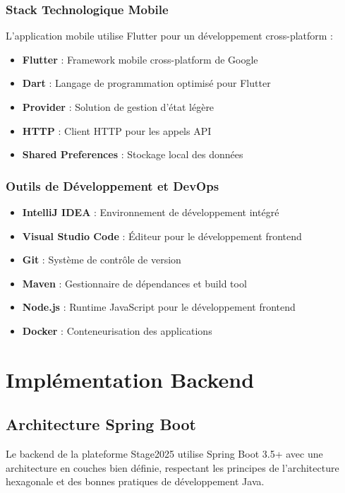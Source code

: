 \documentclass[12pt,a4paper]{report}
\begin{document}
\subsection{Stack Technologique Mobile}

L'application mobile utilise Flutter pour un développement cross-platform :

\begin{itemize}
    \item \textbf{Flutter} : Framework mobile cross-platform de Google
    \item \textbf{Dart} : Langage de programmation optimisé pour Flutter
    \item \textbf{Provider} : Solution de gestion d'état légère
    \item \textbf{HTTP} : Client HTTP pour les appels API
    \item \textbf{Shared Preferences} : Stockage local des données
\end{itemize}

\subsection{Outils de Développement et DevOps}

\begin{itemize}
    \item \textbf{IntelliJ IDEA} : Environnement de développement intégré
    \item \textbf{Visual Studio Code} : Éditeur pour le développement frontend
    \item \textbf{Git} : Système de contrôle de version
    \item \textbf{Maven} : Gestionnaire de dépendances et build tool
    \item \textbf{Node.js} : Runtime JavaScript pour le développement frontend
    \item \textbf{Docker} : Conteneurisation des applications
\end{itemize}

\chapter{Implémentation Backend}

\section{Architecture Spring Boot}

Le backend de la plateforme Stage2025 utilise Spring Boot 3.5+ avec une architecture en couches bien définie, respectant les principes de l'architecture hexagonale et des bonnes pratiques de développement Java.
\end{document}
